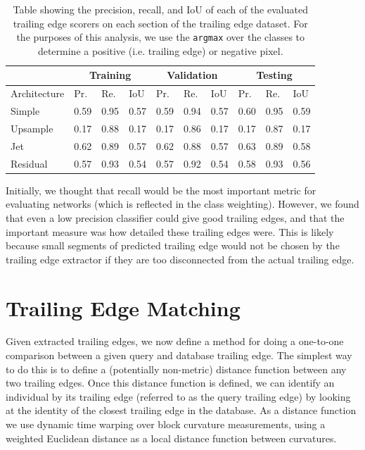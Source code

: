 

\begin{table}[!htb]%
	\centering
	\resizebox{\linewidth}{!}
	{
		\begin{tabular} {l || l | l | l || l | l | l || l | l | l |}
		& \multicolumn{3}{c||}{Training} & \multicolumn{3}{c||}{Validation} & \multicolumn{3}{c|}{Testing} \\
		\hline
		Architecture & Pr. & Re. & IoU & Pr. & Re. & IoU & Pr. & Re. & IoU \\
		\hhline{=#===#===#===|}
		Simple & 0.59 & 0.95 & 0.57 & 0.59 & 0.94 & 0.57 & 0.60 & 0.95 & 0.59 \\
		\hline
		Upsample & 0.17 & 0.88 & 0.17 & 0.17 & 0.86 & 0.17 & 0.17 & 0.87 & 0.17 \\
		\hline
		Jet & 0.62 & 0.89 & 0.57 & 0.62 & 0.88 & 0.57 & 0.63 & 0.89 & 0.58 \\
		\hline
		Residual & 0.57 & 0.93 & 0.54 & 0.57 & 0.92 & 0.54 & 0.58 & 0.93 & 0.56 \\
		\hline
		\end{tabular}
	}
	\caption{Table showing the precision, recall, and IoU of each of the evaluated trailing edge scorers on each section of the trailing edge dataset. For the purposes of this analysis, we use the \texttt{argmax} over the classes to determine a positive (i.e. trailing edge) or negative pixel.}
	\label{tab:te_score_full_analysis}
\end{table}

Initially, we thought that recall would be the most important metric for evaluating networks (which is reflected in the class weighting).
However, we found that even a low precision classifier could give good trailing edges, and that the important measure was how detailed these trailing edges were.
This is likely because small segments of predicted trailing edge would not be chosen by the trailing edge extractor if they are too disconnected from the actual trailing edge.


\section{Trailing Edge Matching}

Given extracted trailing edges, we now define a method for doing a one-to-one comparison between a given query and database trailing edge.
The simplest way to do this is to define a (potentially non-metric) distance function between any two trailing edges.
Once this distance function is defined, we can identify an individual by its trailing edge (referred to as the query trailing edge) by looking at the identity of the closest trailing edge in the database.
As a distance function we use dynamic time warping over block curvature measurements, using a weighted Euclidean distance as a local distance function between curvatures.


